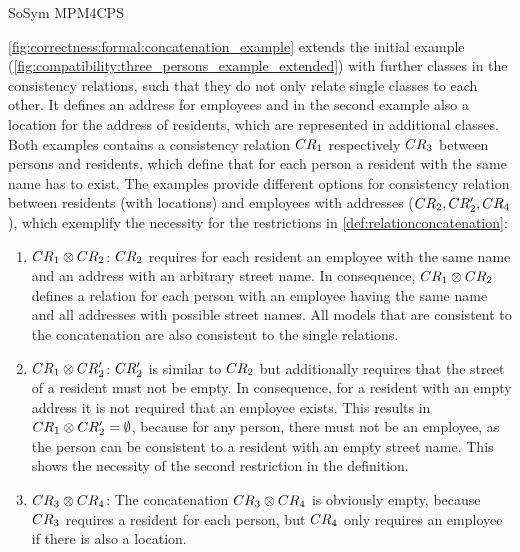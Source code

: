 \begin{copiedFrom}{SoSym MPM4CPS}
\begin{example}
\autoref{fig:correctness:formal:concatenation_example} extends the initial example (\autoref{fig:compatibility:three_persons_example_extended}) with further classes in the consistency relations, such that they do not only relate single classes to each other.
It defines an address for employees and in the second example also a location for the address of residents, which are represented in additional classes.
Both examples contains a consistency relation $CR_{1}$ respectively $CR_{3}$ between persons and residents, which define that for each person a resident with the same name has to exist.
The examples provide different options for consistency relation between residents (with locations) and employees with addresses ($CR_{2}, CR'_{2}, CR_{4}$), which exemplify the necessity for the restrictions in \autoref{def:relationconcatenation}:
\begin{enumerate}
    \item $CR_{1} \otimes CR_{2}$: 
$CR_{2}$ requires for each resident an employee with the same name and an address with an arbitrary street name.
In consequence, $CR_{1} \otimes CR_{2}$ defines a relation for each person with an employee having the same name and all addresses with possible street names.
All models that are consistent to the concatenation are also consistent to the single relations.
    \item $CR_{1} \otimes CR'_{2}$: 
$CR'_{2}$ is similar to $CR_{2}$ but additionally requires that the street of a resident must not be empty. 
In consequence, for a resident with an empty address it is not required that an employee exists.
This results in $CR_{1} \otimes CR'_{2} = \emptyset$, because for any person, there must not be an employee, as the person can be consistent to a resident with an empty street name.
This shows the necessity of the second restriction in the definition. 
    \item $CR_{3} \otimes CR_{4}$: 
The concatenation $CR_{3} \otimes CR_{4}$ is obviously empty, because $CR_{3}$ requires a resident for each person, but $CR_{4}$ only requires an employee if there is also a location.

\end{enumerate}
\end{example}
\end{copiedFrom}
